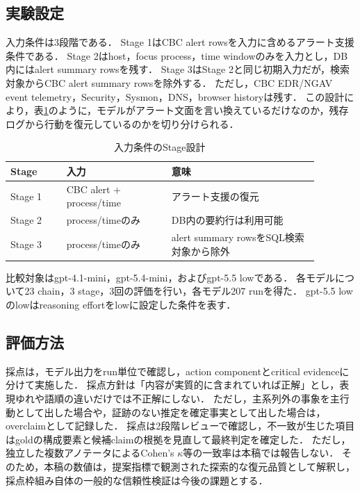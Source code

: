 \documentclass[a4paper,twocolumn,10pt]{article}
\newcommand{\code}[1]{{\small\ttfamily #1}}
\begin{document}
\subsection{実験設定}

入力条件は3段階である．
Stage 1はCBC alert rowsを入力に含めるアラート支援条件である．
Stage 2はhost，focus process，time windowのみを入力とし，DB内にはalert summary rowsを残す．
Stage 3はStage 2と同じ初期入力だが，検索対象からCBC alert summary rowsを除外する．
ただし，CBC EDR/NGAV event telemetry，Security，Sysmon，DNS，browser historyは残す．
この設計により，表\ref{tab:stage_setting}のように，モデルがアラート文面を言い換えているだけなのか，残存ログから行動を復元しているのかを切り分けられる．

\begin{table}[t]
\centering
\footnotesize
\caption{入力条件のStage設計}
\label{tab:stage_setting}
\setlength{\tabcolsep}{3pt}
\begin{tabular}{p{0.16\linewidth}p{0.30\linewidth}p{0.42\linewidth}}
\toprule
Stage & 入力 & 意味 \\
\midrule
Stage 1 & CBC alert + process/time & アラート支援の復元 \\
Stage 2 & process/timeのみ & DB内の要約行は利用可能 \\
Stage 3 & process/timeのみ & alert summary rowsをSQL検索対象から除外 \\
\bottomrule
\end{tabular}
\end{table}

比較対象は\code{gpt-4.1-mini}，\code{gpt-5.4-mini}，および\code{gpt-5.5 low}である．
各モデルについて23 chain，3 stage，3回の評価を行い，各モデル207 runを得た．
\code{gpt-5.5 low}のlowはreasoning effortをlowに設定した条件を表す．

\subsection{評価方法}

採点は，モデル出力をrun単位で確認し，action componentとcritical evidenceに分けて実施した．
採点方針は「内容が実質的に含まれていれば正解」とし，表現ゆれや語順の違いだけでは不正解にしない．
ただし，主系列外の事象を主行動として出した場合や，証跡のない推定を確定事実として出した場合は，overclaimとして記録した．
採点は2段階レビューで確認し，不一致が生じた項目はgoldの構成要素と候補claimの根拠を見直して最終判定を確定した．
ただし，独立した複数アノテータによるCohen's $\kappa$等の一致率は本稿では報告しない．
そのため，本稿の数値は，提案指標で観測された探索的な復元品質として解釈し，採点枠組み自体の一般的な信頼性検証は今後の課題とする．
\end{document}
